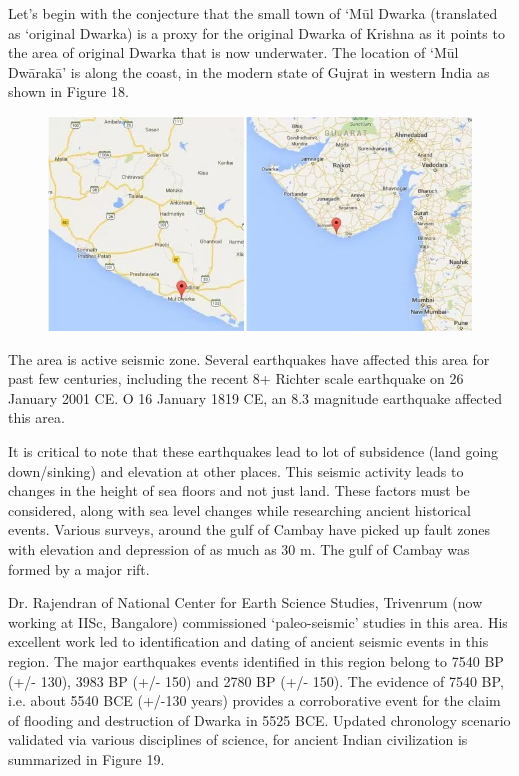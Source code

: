 Let’s begin with the conjecture that the small town of ‘Mūl Dwarka (translated as ‘original Dwarka) is a proxy for the original Dwarka of Krishna as it points to the area of original Dwarka that is now underwater. The location of ‘Mūl Dwārakā’ is along the coast, in the modern state of Gujrat in western India as shown in Figure 18.

\begin{figure}[!htbp]
\includegraphics[scale=0.4]{images/8-18.jpg}
\caption{}\label{art8-fig18}
\end{figure}

The area is active seismic zone. Several earthquakes have affected this area for past few centuries, including the recent 8+ Richter scale earthquake on 26 January 2001 CE. O 16 January 1819 CE, an 8.3 magnitude earthquake affected this area.

It is critical to note that these earthquakes lead to lot of subsidence (land going down/sinking) and elevation at other places. This seismic activity leads to changes in the height of sea floors and not just land. These factors must be considered, along with sea level changes while researching ancient historical events. Various surveys, around the gulf of Cambay have picked up fault zones with elevation and depression of as much as 30 m. The gulf of Cambay was formed by a major rift.

Dr. Rajendran of National Center for Earth Science Studies, Trivenrum (now working at IISc, Bangalore) commissioned ‘paleo-seismic’ studies in this area. His excellent work led to identification and dating of ancient seismic events in this region. The major earthquakes events identified in this region belong to 7540 BP (+/- 130), 3983 BP (+/- 150) and 2780 BP (+/- 150). The evidence of 7540 BP, i.e. about 5540 BCE (+/-130 years) provides a corroborative event for the claim of flooding and destruction of Dwarka in 5525 BCE. Updated chronology scenario validated via various disciplines of science, for ancient Indian civilization is summarized in Figure 19.

